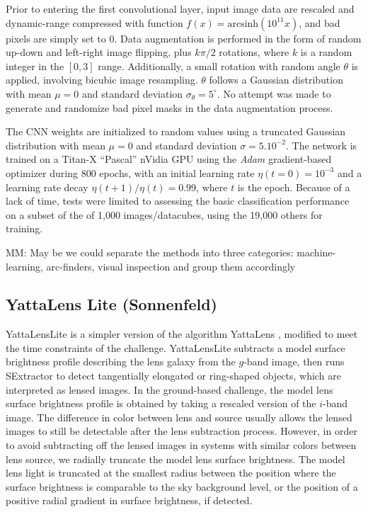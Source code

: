 \documentclass[useAMS,usenatbib]{mnras}
\newcommand{\red}[1]{{\color{red} #1}}
\begin{document}
Prior to entering the first convolutional layer, input image data are rescaled and dynamic-range compressed with function $f(x) =
\mathrm{arcsinh} (10^{11} x)$, and bad pixels are simply set to 0.
Data augmentation is performed in the form of random up-down and left-right image flipping, plus $k\pi/2$ rotations, where $k$ is a random integer in the $[0,3]$ range. Additionally, a small rotation with random angle $\theta$ is applied, involving bicubic image resampling. $\theta$ follows a Gaussian distribution with mean $\mu=0$ and standard deviation $\sigma_{\theta}=5^{\circ}$. No attempt was made to generate and randomize bad pixel masks in the data augmentation process.

The CNN weights are initialized to random values using a truncated Gaussian distribution with mean $\mu=0$ and standard deviation $\sigma=5.10^{-2}$. The network is trained on a Titan-X ``Pascal'' nVidia GPU using the \textit{Adam} gradient-based optimizer \citep{2014arXiv1412.6980K} during 800 epochs, with an initial learning rate $\eta(t=0)=10^{-3}$ and a learning rate decay $\eta(t+1)/\eta(t)=0.99$, where $t$ is the epoch. Because of a lack of time, tests were limited to assessing the basic classification performance on a subset of the of 1,000 images/datacubes, using the 19,000 others for training.

{\red MM: May be we could separate the methods into three categories: machine-learning, arc-finders, visual inspection and group them accordingly}

\subsection{YattaLens Lite (Sonnenfeld)}
YattaLensLite is a simpler version of the algorithm YattaLens \citep{2017arXiv170401585S}, modified to meet the time constraints of the challenge.
YattaLensLite subtracts a model surface brightness profile describing the lens galaxy from the $g$-band image, then runs SExtractor to detect tangentially elongated or ring-shaped objects, which are interpreted as lensed images.
In the ground-based challenge, the model lens surface brightness profile is obtained by taking a rescaled version of the $i$-band image.
The difference in color between lens and source usually allows the lensed images to still be detectable after the lens subtraction process.
However, in order to avoid subtracting off the lensed images in systems with similar colors between lens source, we radially truncate the model lens surface brightness.
The model lens light is truncated at the smallest radius between the position where the surface brightness is comparable to the sky background level, or the position of a positive radial gradient in surface brightness, if detected.
\end{document}
